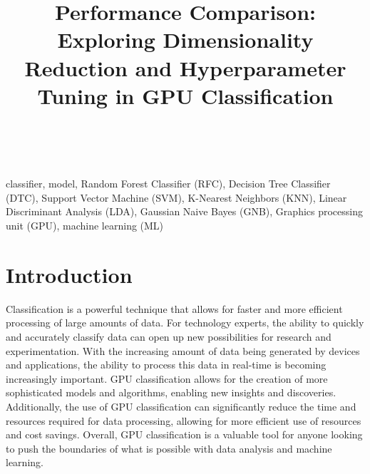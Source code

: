 \documentclass[conference,onecolumn]{IEEEtran}
\begin{document}
\title{Performance Comparison: Exploring Dimensionality Reduction and Hyperparameter Tuning in GPU Classification}

\author{\\

}

\maketitle

\begin{abstract}

\end{abstract}

\begin{IEEEkeywords}
classifier, model, Random Forest Classifier (RFC), Decision Tree Classifier (DTC), Support Vector Machine (SVM), K-Nearest Neighbors (KNN), Linear Discriminant Analysis (LDA), Gaussian Naive Bayes (GNB), Graphics processing unit (GPU), machine learning (ML)
\end{IEEEkeywords}

\newpage
\tableofcontents

\newpage
\section{Introduction}
Classification is a powerful technique that allows for faster and more efficient processing of large amounts of data. For technology experts, the ability to quickly and accurately classify data can open up new possibilities for research and experimentation. With the increasing amount of data being generated by devices and applications, the ability to process this data in real-time is becoming increasingly important. GPU classification allows for the creation of more sophisticated models and algorithms, enabling new insights and discoveries. Additionally, the use of GPU classification can significantly reduce the time and resources required for data processing, allowing for more efficient use of resources and cost savings. Overall, GPU classification is a valuable tool for anyone looking to push the boundaries of what is possible with data analysis and machine learning.
\end{document}
